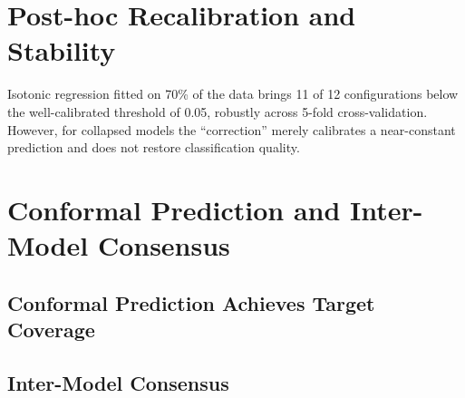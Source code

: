 \section{Post-hoc Recalibration and Stability}
\label{sec:res-recalibration}


\begin{finding}
    Isotonic regression fitted on 70\% of the data brings 11 of 12
    configurations below the well-calibrated threshold of 0.05, robustly
    across 5-fold cross-validation. However, for collapsed models the
    ``correction'' merely calibrates a near-constant prediction and does not
    restore classification quality.
\end{finding}

\section{Conformal Prediction and Inter-Model Consensus}
\label{sec:res-conformal-consensus}

\subsection{Conformal Prediction Achieves Target Coverage}
\label{subsec:res-conformal}


\subsection{Inter-Model Consensus}
\label{subsec:res-consensus}


